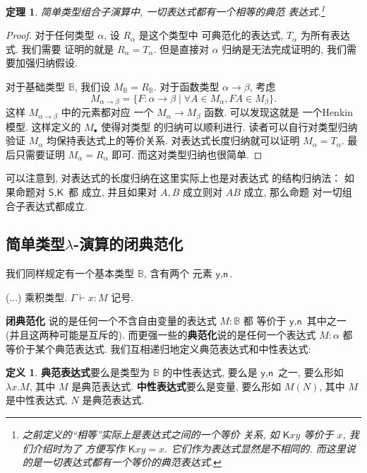 \documentclass[UTF8]{ctexbook}
\newcommand{\cons}[1]{\textsf{#1}}
\theoremstyle{plain}
\newtheorem{theorem}{定理}[chapter]
\theoremstyle{definition}
\newtheorem{definition}{定义}[chapter]
\theoremstyle{remark}
\begin{document}
\begin{theorem}
简单类型组合子演算中, 一切表达式都有一个相等的典范
表达式.\footnote{之前定义的“相等”实际上是表达式之间的一个等价
关系, 如 \(\cons{K}xy\) 等价于 \(x\), 我们介绍时为了
方便写作 \(\cons{K}xy = x\). 它们作为表达式显然是不相同的.
而这里说的是一切表达式都有一个等价的典范表达式.}
\end{theorem}
\begin{proof}
对于任何类型 \(\alpha\), 设 \(R_\alpha\) 是这个类型中
可典范化的表达式, \(T_\alpha\) 为所有表达式. 我们需要
证明的就是 \(R_\alpha = T_\alpha\). 但是直接对 \(\alpha\)
归纳是无法完成证明的, 我们需要加强归纳假设.

对于基础类型 \(\mathbb B\), 我们设 \(M_{\mathbb B} = R_{\mathbb B}\).
对于函数类型 \(\alpha \to \beta\), 考虑
\[M_{\alpha \to \beta} = \{F : \alpha \to \beta \mid
\forall A \in M_\alpha, FA \in M_\beta\}.\]
这样 \(M_{\alpha \to \beta}\) 中的元素都对应
一个 \(M_\alpha \to M_\beta\) 函数. 可以发现这就是
一个Henkin模型. 这样定义的 \(M_\bullet\) 使得对类型
的归纳可以顺利进行. 读者可以自行对类型归纳验证 \(M_\alpha\)
均保持表达式上的等价关系. 对表达式长度归纳就可以证明
\(M_\alpha = T_\alpha\). 最后只需要证明 \(M_\alpha = R_\alpha\)
即可. 而这对类型归纳也很简单.
\end{proof}

可以注意到, 对表达式的长度归纳在这里实际上也是对表达式
的结构归纳法： 如果命题对 \(\cons{S}, \cons{K}\) 都
成立, 并且如果对 \(A,B\) 成立则对 \(AB\) 成立, 那么命题
对一切组合子表达式都成立.

\subsection{简单类型\texorpdfstring{\(\lambda\)}{Lambda}-演算的闭典范化}
我们同样规定有一个基本类型 \(\mathbb B\), 含有两个
元素 \(\cons{y}, \cons{n}\).


(...) 乘积类型. \(\Gamma \vdash x : M\) 记号.


\textbf{闭典范化}
说的是任何一个不含自由变量的表达式
\(M : \mathbb B\) 都
等价于 \(\cons{y}, \cons{n}\) 其中之一
(并且这两种可能是互斥的).
而更强一些的\textbf{典范化}说的是任何一个表达式
\(M : \alpha\) 都等价于某个典范表达式.
我们互相递归地定义典范表达式和中性表达式:
\begin{definition}
\textbf{典范表达式}要么是类型为 \(\mathbb B\) 的中性表达式,
要么是 \(\cons{y},\cons{n}\) 之一,
要么形如 \(\lambda x. M\), 其中 \(M\) 是典范表达式.
\textbf{中性表达式}要么是变量, 要么形如 \(M(N)\), 其中 \(M\)
是中性表达式, \(N\) 是典范表达式.
\end{definition}
\end{document}
